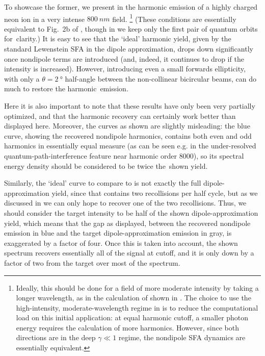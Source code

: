 To showcase the former, we present in  the harmonic emission of a highly charged neon ion in a very intense $\SI{800}{nm}$ field.%
%
\footnote{%
Ideally, this should be done for a field of more moderate intensity by taking a longer wavelength, as in the calculation of  shown in . The choice to use the high-intensity, moderate-wavelength regime in  is to reduce the computational load on this initial application: at equal harmonic cutoff, a smaller photon energy requires the calculation of more harmonics. However, since both directions are in the deep $\gamma\ll1$ regime, the nondipole SFA dynamics are essentially equivalent.
}
%
(These conditions are essentially equivalent to Fig.~2b of \cite{ chirila_nondipole_2002}, though in  we keep only the first pair of quantum orbits for~clarity.)
It is easy to see that the `ideal' harmonic yield, given by the standard Lewenstein SFA in the dipole approximation, drops down significantly once nondipole terms are introduced (and, indeed, it continues to drop if the intensity is increased). However, introducing even a small forwards ellipticity, with only a $\theta=\SI{2}{\degree}$ half-angle between the non-collinear bicircular beams, can do much to restore the harmonic~emission.

Here it is also important to note that these results have only been very partially optimized, and that the harmonic recovery can certainly work better than displayed here. Moreover, the curves as shown are slightly misleading: the blue curve, showing the recovered nondipole harmonics, contains both even and odd harmonics in essentially equal measure (as can be seen e.g. in the under-resolved quantum-path-interference feature near harmonic order 8000), so its spectral energy density should be considered to be twice the~shown yield. 

Similarly, the `ideal' curve to compare to is not exactly the full dipole-approximation yield, since that contains two recollisions per half cycle, but as we discussed in  we can only hope to recover one of the two recollisions. Thus, we should consider the target intensity to be half of the shown dipole-approximation yield, which means that the gap as displayed, between the recovered nondipole emission in blue and the target dipole-approximation emission in gray, is exaggerated by a factor of four. Once this is taken into account, the shown spectrum recovers essentially all of the signal at cutoff, and it is only down by a factor of two from the target over most of the spectrum.


